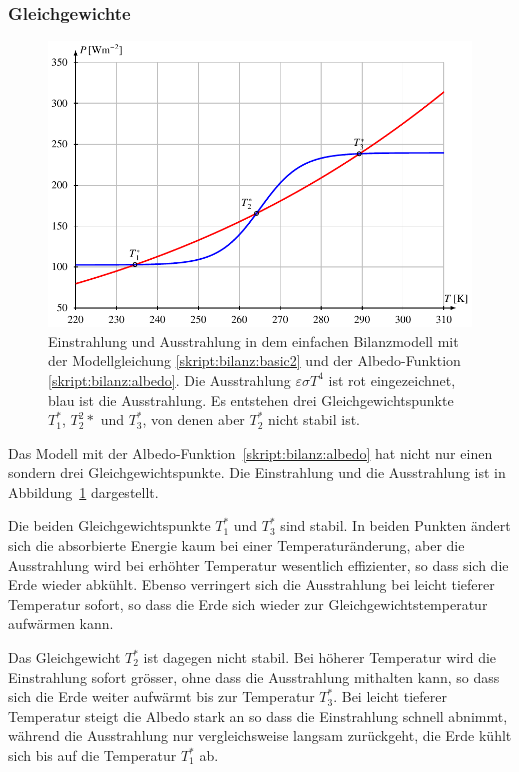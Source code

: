 \subsubsection{Gleichgewichte}
\begin{figure}
\centering
\includegraphics{chapters/5/bilanzmodell.pdf}
\caption{Einstrahlung und Ausstrahlung in dem einfachen Bilanzmodell
mit der Modellgleichung
\eqref{skript:bilanz:basic2} und der Albedo-Funktion
\eqref{skript:bilanz:albedo}.
Die Ausstrahlung $\varepsilon\sigma T^4$ ist rot eingezeichnet,
blau ist die Ausstrahlung.
Es entstehen drei Gleichgewichtspunkte $T_1^*$, $T_2^2*$ und $T_3^*$,
von denen aber $T_2^*$ nicht stabil ist.
\label{skript:bilanz:modellbild}}
\end{figure}
Das Modell mit der Albedo-Funktion~\eqref{skript:bilanz:albedo}
hat nicht nur einen sondern drei Gleichgewichtspunkte.
Die Einstrahlung und die Ausstrahlung ist in
Abbildung~\ref{skript:bilanz:modellbild} dargestellt.

Die beiden Gleichgewichtspunkte $T_1^*$ und $T_3^*$ sind stabil.
In beiden Punkten ändert sich die absorbierte Energie kaum bei
einer Temperaturänderung, aber die Ausstrahlung wird bei erhöhter 
Temperatur wesentlich effizienter, so dass sich die Erde wieder
abkühlt.
Ebenso verringert sich die Ausstrahlung bei leicht tieferer Temperatur
sofort, so dass die Erde sich wieder zur Gleichgewichtstemperatur aufwärmen
kann.

Das Gleichgewicht $T_2^*$ ist dagegen nicht stabil.
Bei höherer Temperatur wird die Einstrahlung sofort grösser, ohne dass
die Ausstrahlung mithalten kann, so dass sich die Erde weiter
aufwärmt bis zur Temperatur $T_3^*$.
Bei leicht tieferer Temperatur steigt die Albedo stark an so dass die
Einstrahlung schnell abnimmt, während die Ausstrahlung nur vergleichsweise
langsam zurückgeht, die Erde kühlt sich bis auf die Temperatur $T_1^*$ ab.

